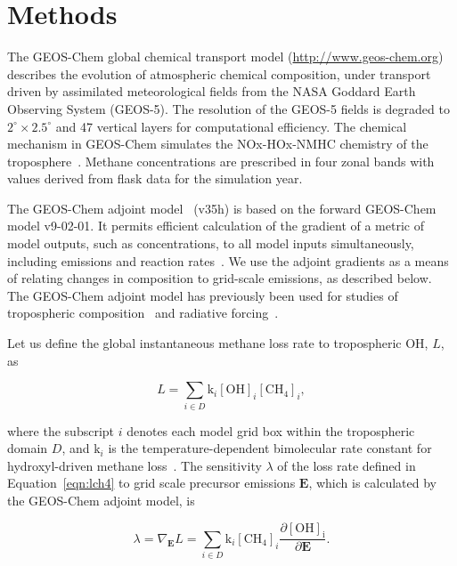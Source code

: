 \section{Methods}

The GEOS-Chem global chemical transport model (\url{http://www.geos-chem.org}) describes the evolution of atmospheric chemical composition, under transport driven by assimilated meteorological fields from the NASA Goddard Earth Observing System (GEOS-5). The resolution of the GEOS-5 fields is degraded to $2^{\circ} \times 2.5^{\circ}$ and 47 vertical layers for computational efficiency. The chemical mechanism in GEOS-Chem simulates the NOx-HOx-NMHC chemistry of the troposphere~\citep{ref:mao2010}. Methane concentrations are prescribed in four zonal bands with values derived from flask data for the simulation year.


The GEOS-Chem adjoint model~\cite{ref:henze2007} (v35h) is based on the forward GEOS-Chem model v9-02-01. It permits efficient calculation of the gradient of a metric of model outputs, such as concentrations, to all model inputs simultaneously, including emissions and reaction rates~\cite{ref:paulot2012}. We use the adjoint gradients as a means of relating changes in composition to grid-scale emissions, as described below. The GEOS-Chem adjoint model has previously been used for studies of tropospheric composition~\citep{ref:zhang2009,ref:walker2012} and radiative forcing~\citep{ref:bowman2012}.

Let us define the global instantaneous methane loss rate to tropospheric OH, $L$, as

\begin{equation}
L=\sum_{i \in D} \mathrm{k}_i \mathrm{[OH]}_i \mathrm{[CH_4]}_i,
\label{eqn:lch4}
\end{equation}

where the subscript $i$ denotes each model grid box within the tropospheric domain $D$, and $\mathrm{k}_i$ is the temperature-dependent bimolecular rate constant for hydroxyl-driven methane loss~\citep{ref:sander2011}. The sensitivity $\lambda$ of the loss rate defined in Equation~\ref{eqn:lch4} to grid scale precursor emissions $\mathbf{E}$, which is calculated by the GEOS-Chem adjoint model, is

\begin{equation}
\lambda = \nabla_\mathbf{E} L = \sum_{i \in D} \mathrm{k}_i \mathrm{[CH_4]}_i \frac{\partial \mathrm{[OH]_i}}{\partial \mathbf{E}}.
\label{eqn:dlde}
\end{equation}

